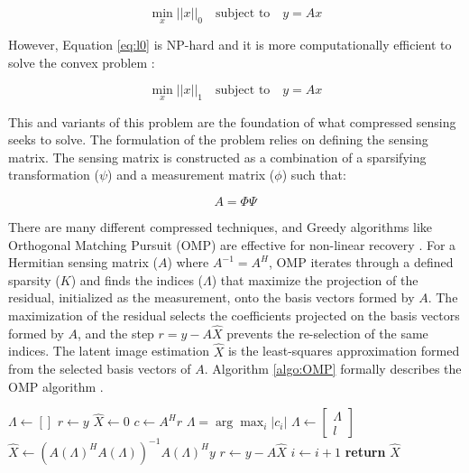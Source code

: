 \documentclass[conference]{IEEEtran}
\begin{document}
\begin{equation}
    \min_{x} ||x||_{0} \quad \text{subject to} \quad y = Ax
    \label{eq:l0}
\end{equation}

However, Equation \ref{eq:l0} is NP-hard and it is more computationally efficient to solve the convex problem \cite{Majumdar_2018}:

\begin{equation}
    \min_{x} ||x||_{1} \quad \text{subject to} \quad y = Ax
\end{equation}

This and variants of this problem are the foundation of what compressed sensing seeks to solve. The formulation of the problem relies on defining the sensing matrix. The sensing matrix is constructed as a combination of a sparsifying transformation ($\psi$) and a measurement matrix ($\phi$) such that:

\begin{equation}
    A = \Phi \Psi
    \label{eq:A}
\end{equation}

There are many different compressed techniques, and Greedy algorithms like Orthogonal Matching Pursuit (OMP) are effective for non-linear recovery \cite{Bostock_2017}. For a Hermitian sensing matrix ($A$) where $A^{-1} = A^{H}$, OMP iterates through a defined sparsity ($K$) and finds the indices ($\Lambda$) that maximize the projection of the residual, initialized as the measurement, onto the basis vectors formed by $A$. The maximization of the residual selects the coefficients projected on the basis vectors formed by $A$, and the step $r = y - A \hat{X}$ prevents the re-selection of the same indices. The latent image estimation $\hat{X}$ is the least-squares approximation formed from the selected basis vectors of $A$. Algorithm \ref{algo:OMP} formally describes the OMP algorithm \cite{Majumdar_2018}.



\begin{algorithm}[H]
\caption{Orthogonal Matching Pursuit}\label{algo:OMP}
\begin{algorithmic}[1]
\State $\Lambda\gets []$
\State $r \gets y$
\State $\hat{X} \gets 0$
\State $c\gets A^{H}r$
\State $\Lambda = \arg\max_{i} \big| c_i \big|$
\State $\Lambda \gets \begin{bmatrix} \Lambda \\ l \end{bmatrix}$
\State $\hat{X} \gets (A(\Lambda)^{H}A(\Lambda))^{-1}A(\Lambda)^{H}y$
\State $r \gets y - A\hat{X}$
\State $i \gets i + 1$
\EndFor
\State \textbf{return} $\hat{X}$
\EndProcedure
\end{algorithmic}
\end{algorithm}
\end{document}

